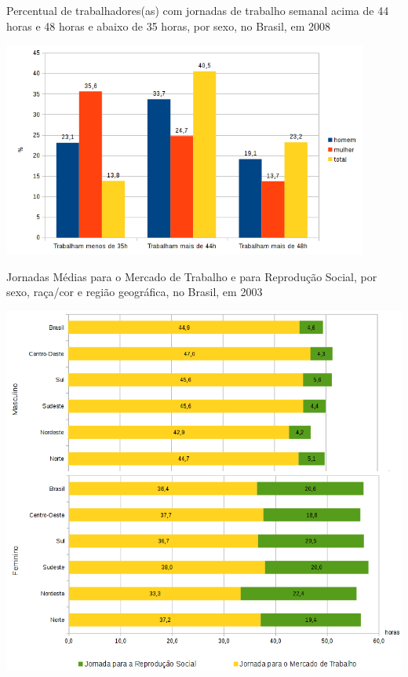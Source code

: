 \begin{grafico}[htb]%
    \caption{\label{graf:percent-jornadas}Percentual de trabalhadores(as) com jornadas de trabalho semanal acima de 44 horas e 48 horas e abaixo de 35 horas, por sexo, no Brasil, em 2008}%
    \begin{center}%
        \includegraphics[width=0.9\textwidth]{./imagens/jornada-muler2003.png}%
    \end{center}%
\end{grafico}%

\begin{grafico}[htb]%
    \caption{\label{graf:jornadas-completas}Jornadas Médias para o Mercado de Trabalho e para Reprodução Social, por sexo, raça/cor e região geográfica, no Brasil, em 2003}%
    \begin{center}%
        \includegraphics[width=1.0\textwidth]{./imagens/jornadas-totais.png}%
    \end{center}%
\end{grafico}%

